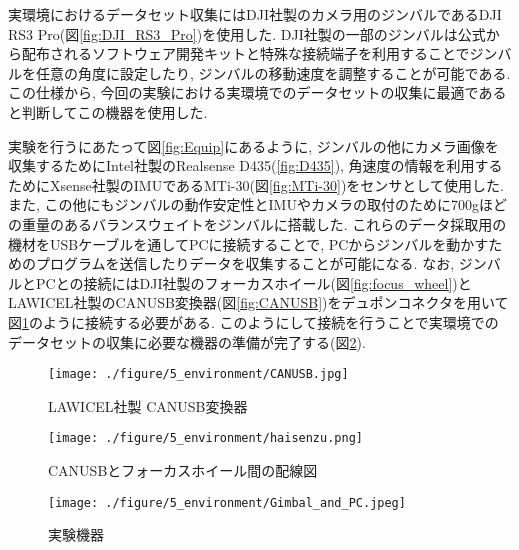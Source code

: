 実環境におけるデータセット収集にはDJI社製のカメラ用のジンバルであるDJI RS3 Pro(図\ref{fig:DJI_RS3_Pro})を使用した. DJI社製の一部のジンバルは公式から配布されるソフトウェア開発キットと特殊な接続端子を利用することでジンバルを任意の角度に設定したり, ジンバルの移動速度を調整することが可能である. この仕様から, 今回の実験における実環境でのデータセットの収集に最適であると判断してこの機器を使用した.\par
実験を行うにあたって図\ref{fig:Equip}にあるように, ジンバルの他にカメラ画像を収集するためにIntel社製のRealsense D435(\ref{fig:D435}), 角速度の情報を利用するためにXsense社製のIMUであるMTi-30(図\ref{fig:MTi-30})をセンサとして使用した. また, この他にもジンバルの動作安定性とIMUやカメラの取付のために700gほどの重量のあるバランスウェイトをジンバルに搭載した. これらのデータ採取用の機材をUSBケーブルを通してPCに接続することで, PCからジンバルを動かすためのプログラムを送信したりデータを収集することが可能になる. なお, ジンバルとPCとの接続にはDJI社製のフォーカスホイール(図\ref{fig:focus_wheel})とLAWICEL社製のCANUSB変換器(図\ref{fig:CANUSB})をデュポンコネクタを用いて図\ref{fig:haisen}のように接続する必要がある. このようにして接続を行うことで実環境でのデータセットの収集に必要な機器の準備が完了する(図\ref{fig:Gimbal_image}).

\begin{figure}[thpb]
  \begin{minipage}[htpb]{0.5\hsize}
  \begin{center}
  \texttt{[image: ./figure/5\_environment/CANUSB.jpg]}
  \caption{LAWICEL社製 CANUSB変換器}
  \label{fig:CANUSB}
  \end{center}
  \end{minipage}
  \begin{minipage}[htpb]{0.5\hsize}
  \begin{center}
  \texttt{[image: ./figure/5\_environment/haisenzu.png]}
  \caption{CANUSBとフォーカスホイール間の配線図}
  \label{fig:haisen}
  \end{center}
  \end{minipage}
\end{figure}


\begin{figure}[thpb]
  \begin{minipage}[htpb]{1.0\hsize}
  \begin{center}
  \texttt{[image: ./figure/5\_environment/Gimbal\_and\_PC.jpeg]}
  \caption{実験機器}
  \label{fig:Gimbal_image}
  \end{center}
  \end{minipage}
\end{figure}


